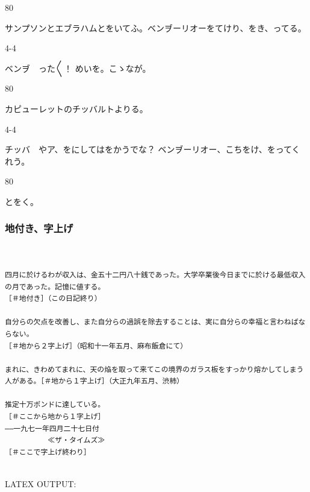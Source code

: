 \documentclass[a4paper,tate]{jlreq}
\begin{document}
\begin{azconvIndented}{8\zw}{0\zw}

サンプソンとエブラハムとをいてふ。ベンヺーリオーをてけり、をき、ってる。

\end{azconvIndented}
\begin{azconvIndented}{4\zw}{-4\zw}

ベンヺ　った{〳〵}！ めいを。こゝなが。

\end{azconvIndented}
\begin{azconvIndented}{8\zw}{0\zw}

カピューレットのチッバルトよりる。

\end{azconvIndented}
\begin{azconvIndented}{4\zw}{-4\zw}

チッバ　やア、をにしてはをかうでな？ ベンヺーリオー、こちをけ、をってくれう。

\end{azconvIndented}
\begin{azconvIndented}{8\zw}{0\zw}

とをく。

\end{azconvIndented}


\newpage
\subsubsection*{地付き、字上げ}
\footnotesize
\linespread{1.0}
\begin{verbatim}


四月に於けるわが収入は、金五十二円八十銭であった。大学卒業後今日までに於ける最低収入の月であった。記憶に値する。
［＃地付き］（この日記終り）

自分らの欠点を改善し、また自分らの過誤を除去することは、実に自分らの幸福と言わねばならない。
［＃地から２字上げ］（昭和十一年五月、麻布飯倉にて）

まれに、きわめてまれに、天の焔を取って来てこの境界のガラス板をすっかり熔かしてしまう人がある。［＃地から１字上げ］（大正九年五月、渋柿）

推定十万ポンドに達している。
［＃ここから地から１字上げ］
――一九七一年四月二十七日付
　　　　　　≪ザ・タイムズ≫
［＃ここで字上げ終わり］


\end{verbatim}
\linespread{1.4}
\normalsize
LATEX OUTPUT:
\zw
\end{document}
